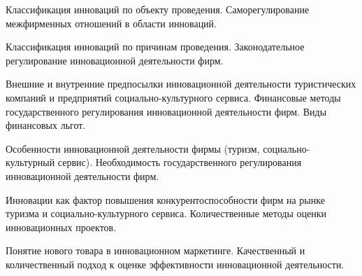 \documentclass[
	14pt,
	a4paper,
	]
	{scrartcl}
\begin{document}
\vfill

\newpage


\shapk
{}
\setcounter{zad}{0}

\vfill
\z Классификация инноваций по объекту проведения.
 \vfill
\z Саморегулирование межфирменных отношений в области инноваций.
 \vfill

\vfill

\newpage


\shapk
{}
\setcounter{zad}{0}

\vfill
\z Классификация инноваций по причинам проведения.
 \vfill
\z Законодательное регулирование инновационной деятельности фирм.
 \vfill

\vfill

\newpage


\shapk
{}
\setcounter{zad}{0}

\vfill
\z Внешние и внутренние предпосылки инновационной деятельности туристических компаний и предприятий социально-культурного сервиса.
 \vfill
\z Финансовые методы государственного регулирования инновационной деятельности фирм. Виды финансовых льгот.
 \vfill

\vfill

\newpage


\shapk
{}
\setcounter{zad}{0}

\vfill
\z Особенности инновационной деятельности фирмы (туризм, социально-культурный сервис).
 \vfill
\z Необходимость государственного регулирования инновационной деятельности фирм.
 \vfill

\vfill

\newpage


\shapk
{}
\setcounter{zad}{0}

\vfill
\z Инновации как фактор повышения конкурентоспособности фирм на рынке туризма и социально-культурного сервиса.
 \vfill
\z Количественные методы оценки инновационных проектов.
 \vfill

\vfill

\newpage


\shapk
{}
\setcounter{zad}{0}

\vfill
\z Понятие нового товара в инновационном маркетинге.
 \vfill
\z Качественный и количественный подход к оценке эффективности инновационной деятельности.
 \vfill

\vfill

\newpage
\end{document}
